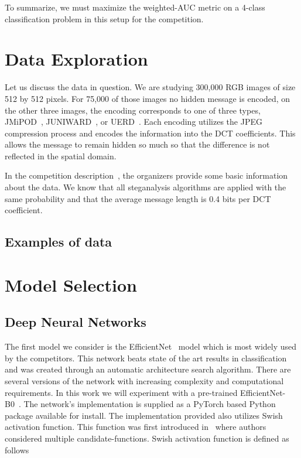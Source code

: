 \documentclass[letterpaper]{article}
\begin{document}
To summarize, we must maximize the weighted-AUC metric on a 4-class classification problem in this setup for the competition.

\section{Data Exploration}

Let us discuss the data in question. We are studying 300,000 RGB images of size 512 by 512 pixels. For 75,000 of those images no hidden message is encoded, on the other three images, the encoding corresponds to one of three types, JMiPOD~\cite{jmipod}, JUNIWARD~\cite{juniward}, or UERD~\cite{uerd}. Each encoding utilizes the JPEG compression process and encodes the information into the DCT coefficients. This allows the message to remain hidden so much so that the difference is not reflected in the spatial domain.

In the competition description~\cite{alaska2}, the organizers provide some basic information about the data. We know that all steganalysis algorithms are applied with the same probability and that the average message length is 0.4 bits per DCT coefficient.

\subsection{Examples of data}




\section{Model Selection}

\subsection{Deep Neural Networks}

The first model we consider is the EfficientNet~\cite{tan2019efficientnet} model which is most widely used by the competitors.
This network beats state of the art results in classification and was created through an automatic architecture search algorithm. There are several versions of the network with increasing complexity and computational requirements. In this work we will experiment with a pre-trained EfficientNet-B0~\cite{tan2019efficientnet}. The network's implementation is supplied as a PyTorch based Python package available for install. The implementation provided also utilizes Swish activation function. This function was first introduced in~\cite{ramachandran2017searching} where authors considered multiple candidate-functions. Swish activation function is defined as follows
\end{document}
